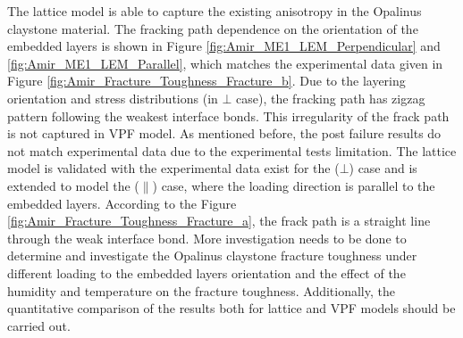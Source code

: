 The lattice model is able to capture the existing anisotropy in the Opalinus claystone material. The fracking path dependence on the orientation of the embedded layers is shown in Figure \ref{fig:Amir_ME1_LEM_Perpendicular} and \ref{fig:Amir_ME1_LEM_Parallel}, which matches the experimental data given in Figure \ref{fig:Amir_Fracture_Toughness_Fracture_b}. Due to the layering orientation and stress distributions (in $\bot$ case), the fracking path has zigzag pattern following the weakest interface bonds. This irregularity of the frack path is not captured in VPF model. As mentioned before, the post failure results do not match experimental data due to the experimental tests limitation. The lattice model is validated with the experimental data exist for the ($\bot$) case and is extended to model the ($\parallel$) case, where the loading direction is parallel to the embedded layers. According to the Figure \ref{fig:Amir_Fracture_Toughness_Fracture_a}, the frack path is a straight line through the weak interface bond. More investigation needs to be done to determine and investigate the Opalinus claystone fracture toughness under different loading to the embedded layers orientation and the effect of the humidity and temperature on the fracture toughness. Additionally, the quantitative comparison of the results both for lattice and VPF models should be carried out.


